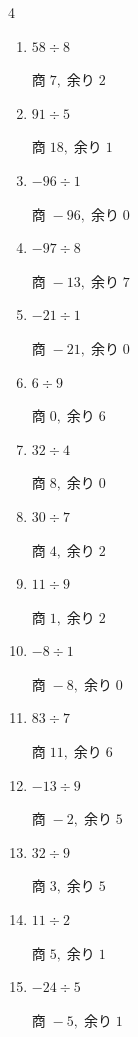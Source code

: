 \begin{multicols}{4}
\begin{enumerate}
        $商\; 7,\; 余り\; 1$

  \item $58 \div 8$

        $商\; 7,\; 余り\; 2$

  \item $91 \div 5$

        $商\; 18,\; 余り\; 1$

  \item $-96 \div 1$

        $商\; -96,\; 余り\; 0$

  \item $-97 \div 8$

        $商\; -13,\; 余り\; 7$

  \item $-21 \div 1$

        $商\; -21,\; 余り\; 0$

  \item $6 \div 9$

        $商\; 0,\; 余り\; 6$

  \item $32 \div 4$

        $商\; 8,\; 余り\; 0$

  \item $30 \div 7$

        $商\; 4,\; 余り\; 2$

  \item $11 \div 9$

        $商\; 1,\; 余り\; 2$

  \item $-8 \div 1$

        $商\; -8,\; 余り\; 0$

  \item $83 \div 7$

        $商\; 11,\; 余り\; 6$

  \item $-13 \div 9$

        $商\; -2,\; 余り\; 5$

  \item $32 \div 9$

        $商\; 3,\; 余り\; 5$

  \item $11 \div 2$

        $商\; 5,\; 余り\; 1$

  \item $-24 \div 5$

        $商\; -5,\; 余り\; 1$


\end{enumerate}
\end{multicols}

